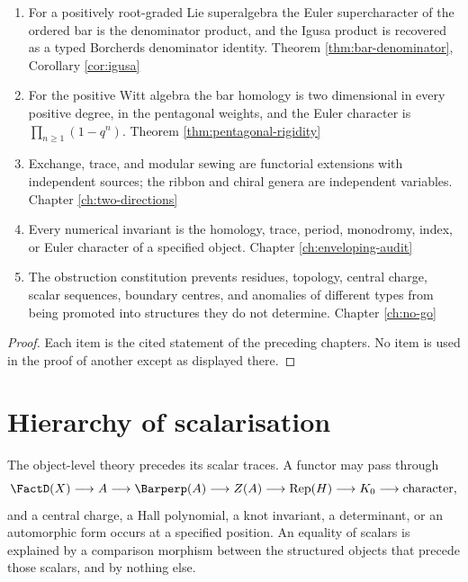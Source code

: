 \begin{maintheorem}
\begin{enumerate}
  internal PBW.
  \hfill{\small Theorem \ref{thm:bar-chevalley}}
\item For a positively root-graded Lie superalgebra the Euler
  supercharacter of the ordered bar is the denominator product, and the
  Igusa product is recovered as a typed Borcherds denominator identity.
  \hfill{\small Theorem \ref{thm:bar-denominator},
  Corollary \ref{cor:igusa}}
\item For the positive Witt algebra the bar homology is two dimensional in
  every positive degree, in the pentagonal weights, and the Euler
  character is $\prod_{n\ge1}(1-q^n)$.
  \hfill{\small Theorem \ref{thm:pentagonal-rigidity}}
\item Exchange, trace, and modular sewing are functorial extensions with
  independent sources; the ribbon and chiral genera are independent
  variables.
  \hfill{\small Chapter \ref{ch:two-directions}}
\item Every numerical invariant is the homology, trace, period, monodromy,
  index, or Euler character of a specified object.
  \hfill{\small Chapter \ref{ch:enveloping-audit}}
\item The obstruction constitution prevents residues, topology, central
  charge, scalar sequences, boundary centres, and anomalies of different
  types from being promoted into structures they do not determine.
  \hfill{\small Chapter \ref{ch:no-go}}
\end{enumerate}
\end{maintheorem}

\begin{proof}
Each item is the cited statement of the preceding chapters. No item is used
in the proof of another except as displayed there.
\end{proof}

\section{Hierarchy of scalarisation}

The object-level theory precedes its scalar traces. A functor may pass
through
\[
  \FactD(X) \longrightarrow A \longrightarrow \Barperp(A)
  \longrightarrow Z(A) \longrightarrow \mathrm{Rep}(H)
  \longrightarrow K_0 \longrightarrow \text{character},
\]
and a central charge, a Hall polynomial, a knot invariant, a determinant,
or an automorphic form occurs at a specified position. An equality of
scalars is explained by a comparison morphism between the structured
objects that precede those scalars, and by nothing else.

